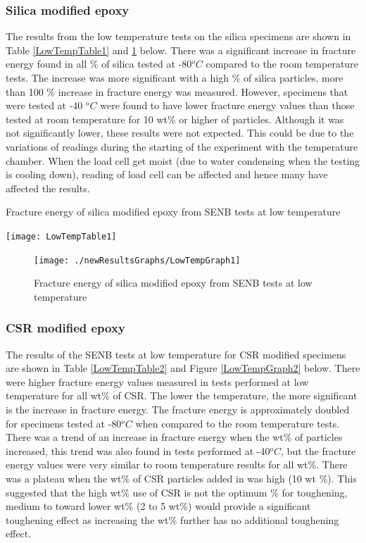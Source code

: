 \documentclass[numbers=noendperiod,chapterprefix=on]{icldt} %
\begin{document}
\subsubsection{Silica modified epoxy}
The results from the low temperature tests on the silica specimens are shown in Table \ref{LowTempTable1} and \ref{LowTempGraph1} below.
There was a significant increase in fracture energy found in all \% of silica tested at -80$^oC$ compared to the room temperature tests. The increase was more significant with a high \% of silica particles, more than 100 \% increase in fracture energy was measured. However, specimens that were tested at -40 $^oC$ were found to have lower fracture energy values than those tested at room temperature for 10 wt\% or higher of particles. Although it was not significantly lower, these results were not expected. This could be due to the variations of readings during the starting of the experiment with the temperature chamber. When the load cell get moist (due to water condensing when the testing is cooling down), reading of load cell can be affected and hence many have affected the results.

\begin{table}[!t]
\centering
\caption{Fracture energy of silica modified epoxy from SENB tests at low temperature} \label{LowTempTable1}
\texttt{[image: LowTempTable1]}
\end{table}
\FloatBarrier

\begin{figure}[!h]
\centering
\texttt{[image: ./newResultsGraphs/LowTempGraph1]}
\caption{Fracture energy of silica modified epoxy from SENB tests at low temperature}\label{LowTempGraph1}
\end{figure}
\FloatBarrier

\subsubsection{CSR modified epoxy}
The results of the SENB tests at low temperature for CSR modified specimens are shown in Table \ref{LowTempTable2} and Figure \ref{LowTempGraph2} below.
There were higher fracture energy values measured in tests performed at low temperature for all wt\% of CSR. The lower the temperature, the more significant is the increase in fracture energy. The fracture energy is approximately doubled for specimens tested at -80$^oC$ when compared to the room temperature tests. There was a trend of an increase in fracture energy when the wt\% of particles increased, this trend was also found in tests performed at -40$^oC$, but the fracture energy values were very similar to room temperature results for all wt\%. 
 There was a plateau when the wt\% of CSR particles added in was high (10 wt \%). This suggested that the high wt\% use of CSR is not the optimum \% for toughening, medium to toward lower wt\% (2 to 5 wt\%) would provide a significant toughening effect as increasing the wt\% further has no additional toughening effect.
\end{document}
